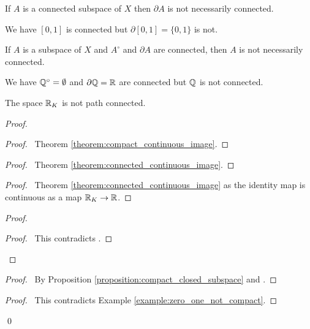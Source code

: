 \begin{example}
    If $A$ is a connected subspace of $X$ then $\partial A$ is not necessarily connected.

    We have $[0,1]$ is connected but $\partial [0,1] = \{ 0, 1 \}$ is not.
\end{example}

\begin{example}
    If $A$ is a subspace of $X$ and $A^\circ$ and $\partial A$ are connected, then $A$ is not necessarily connected.

    We have $\mathbb{Q}^\circ = \emptyset$ and $\partial \mathbb{Q} = \mathbb{R}$ are connected but $\mathbb{Q}$ is not connected.
\end{example}

\begin{example}
    The space $\mathbb{R}_K$ is not path connected.
\end{example}

\begin{proof}
    \pf
    \begin{proof}
        \pf\ Theorem \ref{theorem:compact_continuous_image}.
    \end{proof}
    \begin{proof}
        \pf\ Theorem \ref{theorem:connected_continuous_image}.
    \end{proof}
    \begin{proof}
        \pf\ Theorem \ref{theorem:connected_continuous_image} as
        the identity map is continuous as a map $\mathbb{R}_K \rightarrow \mathbb{R}$.
    \end{proof}
    \begin{proof}
        \qedstep
        \begin{proof}
            \pf\ This contradicts .
        \end{proof}
    \end{proof}
    \begin{proof}
        \pf\ By Proposition \ref{proposition:compact_closed_subspace}
        and .
    \end{proof}
    \qedstep
    \begin{proof}
        \pf\ This contradicts Example \ref{example:zero_one_not_compact}.
    \end{proof}
    \qed
\end{proof}

